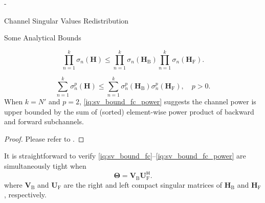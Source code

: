 \begin{section}{-}
\begin{subsection}{Channel Singular Values Redistribution}
\begin{subsubsection}{Some Analytical Bounds}
			\begin{corollary}\label{co:product_singular_values}
				\begin{equation}
					\prod_{n=1}^k \sigma_n(\mathbf{H}) \le \prod_{n=1}^k \sigma_n(\mathbf{H}_\mathrm{B}) \prod_{n=1}^k \sigma_n(\mathbf{H}_\mathrm{F}).
				\end{equation}
			\end{corollary}


			\begin{corollary}
				\begin{equation}
					\sum_{n=1}^k \sigma_n^p(\mathbf{H}) \le \sum_{n=1}^k \sigma_n^p(\mathbf{H}_\mathrm{B}) \sigma_n^p(\mathbf{H}_\mathrm{F}), \quad p > 0.
					\label{iq:sv_bound_fc_power}
				\end{equation}
				When $k = N'$ and $p = 2$, \eqref{iq:sv_bound_fc_power} suggests the channel power is upper bounded by the sum of (sorted) element-wise power product of backward and forward subchannels.
			\end{corollary}
			\begin{proof}
				Please refer to \cite[Inequality 24.4.7]{Hogben2013}.
			\end{proof}

			\begin{remark}
				It is straightforward to verify \eqref{iq:sv_bound_fc}--\eqref{iq:sv_bound_fc_power} are simultaneously tight when
				\begin{equation}
					\mathbf{\Theta} = \mathbf{V}_\mathrm{B} \mathbf{U}_\mathrm{F}^\mathsf{H}.
					\label{eq:scattering_fc_tight}
				\end{equation}
				where $\mathbf{V}_\mathrm{B}$ and $\mathbf{U}_\mathrm{F}$ are the right and left compact singular matrices of $\mathbf{H}_\mathrm{B}$ and $\mathbf{H}_\mathrm{F}$, respectively.
			\end{remark}


\end{subsubsection}
\end{subsection}
\end{section}
